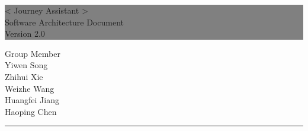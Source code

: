 \documentclass[10pt]{article}
\begin{document}

\begin{titlepage} %
	
	
	\colorbox{grey}{
		\parbox[t]{1.1\textwidth}{ %
			\parbox[t]{1.02\textwidth}{ %
				\raggedleft %
				\fontsize{34pt}{40pt}\selectfont %
				\vspace{0.7cm} %
				
				< Journey Assistant >\\
                Software Architecture Document\\
                Version 2.0\\
				
				\vspace{0.7cm} %
			}
		}
	}
	
	\vfill %
	
	
	\parbox[t]{1\textwidth}{ %
		\raggedleft %
		\large %
		{\Large Group Member}\\[4pt] %
        Yiwen Song\\
        Zhihui Xie\\
        Weizhe Wang\\
        Huangfei Jiang\\
        Haoping Chen\\
		
		\hfill\rule{0.2\linewidth}{1pt}%
    }
    
	
\end{titlepage}
\end{document}
